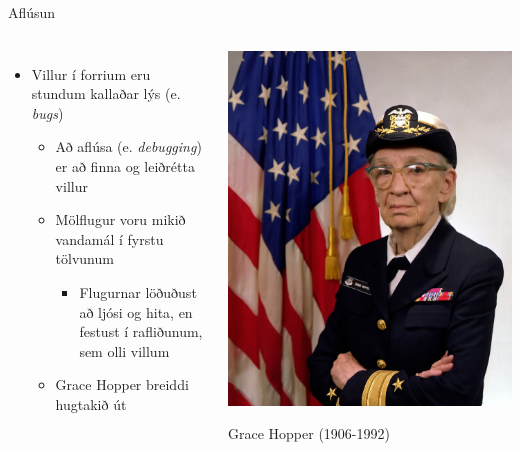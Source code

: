 \documentclass{beamer}
\begin{document}
\begin{frame}{Aflúsun}
\begin{columns}
\begin{itemize}
 \item Villur í forrium eru stundum kallaðar lýs (e. \emph{bugs})
 \begin{itemize}
  \item Að aflúsa (e. \emph{debugging}) er að finna og leiðrétta villur
 \end{itemize}
 \begin{itemize}
  \item Mölflugur voru mikið vandamál í fyrstu tölvunum
  \begin{itemize}
   \item Flugurnar löðuðust að ljósi og hita, en festust í rafliðunum, sem olli villum
  \end{itemize}
 \item Grace Hopper breiddi hugtakið út
 \end{itemize}
\end{itemize}
\begin{center}
\includegraphics[width=0.8\linewidth]{../Pics/grace_hopper}

{\scriptsize Grace Hopper (1906-1992) }
\end{center}
\end{columns}
\end{frame}
\end{document}
